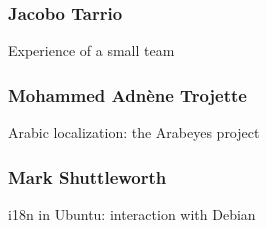 \documentclass{beamer}
\begin{document}
\begin{frame}
  \frametitle{Jacobo Tarrio}
	\begin{block}
		{Experience of a small team}
	\end{block}
\end{frame}

\begin{frame}
  \frametitle{Mohammed Adnène Trojette}
	\begin{block}
		{Arabic localization: the Arabeyes project}
	\end{block}
\end{frame}

\begin{frame}
  \frametitle{Mark Shuttleworth}
	\begin{block}
		{i18n in Ubuntu: interaction with Debian}
	\end{block}
\end{frame}
\end{document}
